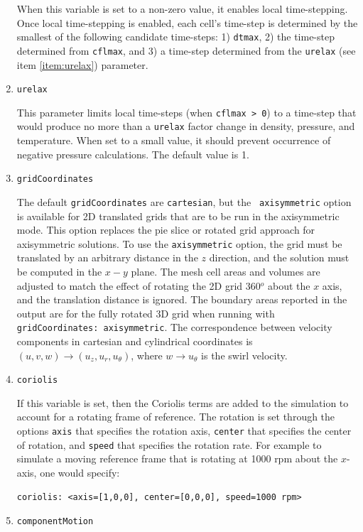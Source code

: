 \documentclass{article}
\begin{document}
\begin{enumerate}
  When this variable is set to a non-zero value, it enables local
  time-stepping.  Once local time-stepping is enabled, each cell's
  time-step is determined by the smallest of the following
  candidate time-steps:  1) {\tt dtmax}, 2) the time-step determined
  from {\tt cflmax}, and 3) a time-step determined from the {\tt urelax}
  (see item \ref{item:urelax}) parameter.

\item {\tt urelax} \label{item:urelax}

  This parameter limits local time-steps (when {\tt cflmax > 0})
  to a time-step that would produce no more than a {\tt urelax} factor
  change in density, pressure, and temperature.  When set to a small
  value, it should prevent occurrence of negative pressure calculations.
  The default value is 1.

\item {\tt gridCoordinates}

  The default {\tt gridCoordinates} are {\tt cartesian}, but the {\tt
    axisymmetric} option is available for 2D translated grids that are
  to be run in the axisymmetric mode.  This option replaces the pie
  slice or rotated grid approach for axisymmetric solutions.  To use
  the {\tt axisymmetric} option, the grid must be translated by an
  arbitrary distance in the $z$ direction, and the solution must be
  computed in the $x-y$ plane.  The mesh cell areas and volumes are
  adjusted to match the effect of rotating the 2D grid 360$^o$ about
  the $x$ axis, and the translation distance is ignored.  The boundary
  areas reported in the output are for the fully rotated 3D grid when
  running with {\tt gridCoordinates: axisymmetric}.  The
  correspondence between velocity components in cartesian and
  cylindrical coordinates is $(u, v, w) \rightarrow (u_z, u_r,
  u_{\theta})$, where $w \rightarrow u_{\theta}$ is the swirl
  velocity.


\item {\tt coriolis }

  If this variable is set, then the Coriolis terms are added to the
  simulation to account for a rotating frame of reference.  The
  rotation is set through the options {\tt axis} that specifies the
  rotation axis, {\tt center} that specifies the center of rotation,
  and {\tt speed} that specifies the rotation rate.  For example
  to simulate a moving reference frame that is rotating at 1000 rpm
  about the $x$-axis, one would specify:
\begin{verbatim}
coriolis: <axis=[1,0,0], center=[0,0,0], speed=1000 rpm>
\end{verbatim}
\item {\tt componentMotion }


\end{enumerate}
\end{document}
